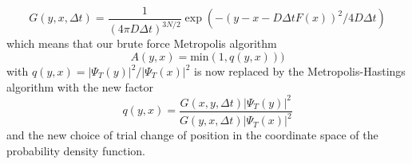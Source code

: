 \documentclass[10pt,a4paper,titlepage]{article}
\begin{document}
\begin{equation}
  G(y,x,\Delta t) = \frac{1}{(4\pi D\Delta t)^{3N/2}} \exp{\left(-(y-x-D\Delta t F(x))^2/4D\Delta t\right)}
\end{equation}
which means that our brute force Metropolis algorithm
\begin{equation}
A(y,x) = \mathrm{min}(1,q(y,x)))
\end{equation}
with $q(y,x) = |\Psi_T(y)|^2/|\Psi_T(x)|^2$ is now replaced by the Metropolis-Hastings algorithm with the new factor
\begin{equation}
q(y,x) = \frac{G(x,y,\Delta t)|\Psi_T(y)|^2}{G(y,x,\Delta t)|\Psi_T(x)|^2}
\end{equation}
and the new choice of trial change of position in the coordinate space of the probability density function.
\end{document}
